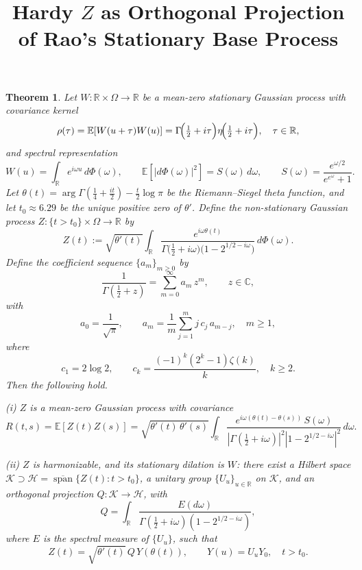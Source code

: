 \documentclass{amsart}
\newtheorem{theorem}{Theorem}
\begin{document}
\title{Hardy $Z$ as Orthogonal Projection of Rao's Stationary Base Process}
\maketitle

\begin{theorem}
Let $W:\mathbb{R}\times\Omega\to\mathbb{R}$ be a mean-zero stationary
Gaussian process with covariance kernel
\[
  \rho(\tau)
  = \mathbb{E}[W(u+\tau)W(u)]
  = \Gamma\!\Bigl(\tfrac{1}{2}+i\tau\Bigr)
    \eta\!\Bigl(\tfrac{1}{2}+i\tau\Bigr),
  \quad \tau\in\mathbb{R},
\]
and spectral representation
\[
  W(u) = \int_{\mathbb{R}} e^{i\omega u}\,d\Phi(\omega),
  \qquad
  \mathbb{E}[|d\Phi(\omega)|^2] = S(\omega)\,d\omega,
  \qquad
  S(\omega) = \frac{e^{\omega/2}}{e^{e^{\omega}}+1}.
\]
Let $\theta(t)=\arg\Gamma(\frac{1}{4}+\frac{it}{2})-\frac{t}{2}\log\pi$
be the Riemann--Siegel theta function, and let $t_0\approx 6.29$ be the
unique positive zero of $\theta'$.  Define the non-stationary Gaussian
process $Z:\{t>t_0\}\times\Omega\to\mathbb{R}$ by
\[
  Z(t) := \sqrt{\theta'(t)}
  \int_{\mathbb{R}}
  \frac{e^{i\omega\theta(t)}}
       {\Gamma\!\bigl(\tfrac{1}{2}+i\omega\bigr)
        \bigl(1-2^{1/2-i\omega}\bigr)}
  \,d\Phi(\omega).
\]
Define the coefficient sequence $\{a_m\}_{m\ge 0}$ by
\[
  \frac{1}{\Gamma(\tfrac{1}{2}+z)}
  = \sum_{m=0}^{\infty} a_m\,z^m,
  \qquad z\in\mathbb{C},
\]
with
\[
  a_0 = \frac{1}{\sqrt{\pi}},
  \qquad
  a_m = \frac{1}{m}\sum_{j=1}^{m} j\,c_j\,a_{m-j},
  \quad m\ge 1,
\]
where
\[
  c_1 = 2\log 2,
  \qquad
  c_k = \frac{(-1)^k(2^k-1)\zeta(k)}{k},
  \quad k\ge 2.
\]
Then the following hold.

\smallskip
\noindent\textup{(i)} $Z$ is a mean-zero Gaussian process with covariance
\[
  R(t,s)
  = \mathbb{E}[Z(t)Z(s)]
  = \sqrt{\theta'(t)\,\theta'(s)}
    \int_{\mathbb{R}}
    \frac{e^{i\omega(\theta(t)-\theta(s))}\,S(\omega)}
         {|\Gamma(\tfrac{1}{2}+i\omega)|^2
          |1-2^{1/2-i\omega}|^2}
    \,d\omega.
\]

\noindent\textup{(ii)} $Z$ is harmonizable, and its stationary dilation
is $W$: there exist a Hilbert space $\mathcal{K}\supset
\mathcal{H}=\overline{\operatorname{span}}\{Z(t):t>t_0\}$, a unitary
group $\{U_u\}_{u\in\mathbb{R}}$ on $\mathcal{K}$, and an orthogonal
projection $Q:\mathcal{K}\to\mathcal{H}$, with
\[
  Q = \int_{\mathbb{R}}
      \frac{E(d\omega)}
           {\Gamma(\tfrac{1}{2}+i\omega)(1-2^{1/2-i\omega})},
\]
where $E$ is the spectral measure of $\{U_u\}$, such that
\[
  Z(t) = \sqrt{\theta'(t)}\,Q\,Y(\theta(t)),
  \qquad Y(u)=U_u Y_0,
  \quad t>t_0.
\]


\end{theorem}
\end{document}
